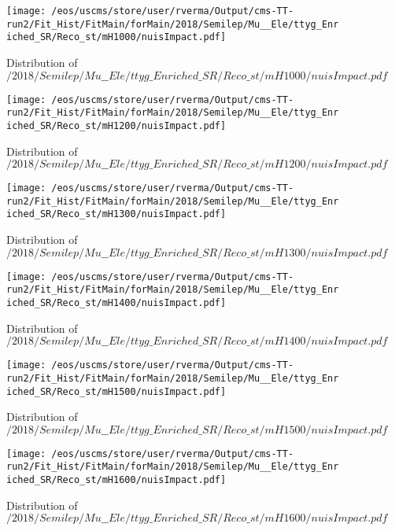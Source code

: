 \begin{figure}
\centering
\texttt{[image: /eos/uscms/store/user/rverma/Output/cms-TT-run2/Fit\_Hist/FitMain/forMain/2018/Semilep/Mu\_\_Ele/ttyg\_Enriched\_SR/Reco\_st/mH1000/nuisImpact.pdf]}
\caption{Distribution of $/2018/Semilep/Mu\_\_Ele/ttyg\_Enriched\_SR/Reco\_st/mH1000/nuisImpact.pdf$}
\end{figure}

\begin{figure}
\centering
\texttt{[image: /eos/uscms/store/user/rverma/Output/cms-TT-run2/Fit\_Hist/FitMain/forMain/2018/Semilep/Mu\_\_Ele/ttyg\_Enriched\_SR/Reco\_st/mH1200/nuisImpact.pdf]}
\caption{Distribution of $/2018/Semilep/Mu\_\_Ele/ttyg\_Enriched\_SR/Reco\_st/mH1200/nuisImpact.pdf$}
\end{figure}

\begin{figure}
\centering
\texttt{[image: /eos/uscms/store/user/rverma/Output/cms-TT-run2/Fit\_Hist/FitMain/forMain/2018/Semilep/Mu\_\_Ele/ttyg\_Enriched\_SR/Reco\_st/mH1300/nuisImpact.pdf]}
\caption{Distribution of $/2018/Semilep/Mu\_\_Ele/ttyg\_Enriched\_SR/Reco\_st/mH1300/nuisImpact.pdf$}
\end{figure}

\begin{figure}
\centering
\texttt{[image: /eos/uscms/store/user/rverma/Output/cms-TT-run2/Fit\_Hist/FitMain/forMain/2018/Semilep/Mu\_\_Ele/ttyg\_Enriched\_SR/Reco\_st/mH1400/nuisImpact.pdf]}
\caption{Distribution of $/2018/Semilep/Mu\_\_Ele/ttyg\_Enriched\_SR/Reco\_st/mH1400/nuisImpact.pdf$}
\end{figure}

\begin{figure}
\centering
\texttt{[image: /eos/uscms/store/user/rverma/Output/cms-TT-run2/Fit\_Hist/FitMain/forMain/2018/Semilep/Mu\_\_Ele/ttyg\_Enriched\_SR/Reco\_st/mH1500/nuisImpact.pdf]}
\caption{Distribution of $/2018/Semilep/Mu\_\_Ele/ttyg\_Enriched\_SR/Reco\_st/mH1500/nuisImpact.pdf$}
\end{figure}

\begin{figure}
\centering
\texttt{[image: /eos/uscms/store/user/rverma/Output/cms-TT-run2/Fit\_Hist/FitMain/forMain/2018/Semilep/Mu\_\_Ele/ttyg\_Enriched\_SR/Reco\_st/mH1600/nuisImpact.pdf]}
\caption{Distribution of $/2018/Semilep/Mu\_\_Ele/ttyg\_Enriched\_SR/Reco\_st/mH1600/nuisImpact.pdf$}
\end{figure}

